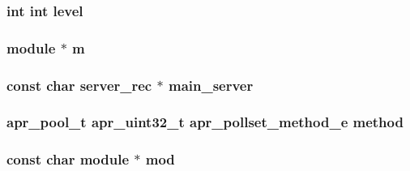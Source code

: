 \subsubsection[{\texorpdfstring{level}{level}}]{ {\bf int} {\bf int} level}\hypertarget{group__APACHE__CORE__CONFIG_ga46c1c4bc138aad1e20504bbee34f35a7}{}\label{group__APACHE__CORE__CONFIG_ga46c1c4bc138aad1e20504bbee34f35a7}
\subsubsection[{\texorpdfstring{m}{m}}]{ {\bf module} $\ast$ m}\hypertarget{group__APACHE__CORE__CONFIG_ga1891337ee8668593918a50b9e04be486}{}\label{group__APACHE__CORE__CONFIG_ga1891337ee8668593918a50b9e04be486}
\subsubsection[{\texorpdfstring{main\+\_\+server}{main_server}}]{\setlength{\rightskip}{0pt plus 5cm}const char {\bf server\+\_\+rec} $\ast$ main\+\_\+server}\hypertarget{group__APACHE__CORE__CONFIG_ga2e75076017a456eca3d9cb2098e66fbb}{}\label{group__APACHE__CORE__CONFIG_ga2e75076017a456eca3d9cb2098e66fbb}
\subsubsection[{\texorpdfstring{method}{method}}]{ {\bf apr\+\_\+pool\+\_\+t} {\bf apr\+\_\+uint32\+\_\+t} {\bf apr\+\_\+pollset\+\_\+method\+\_\+e} method}\hypertarget{group__APACHE__CORE__CONFIG_ga6c1b16298acdfc2ca3cba871da0daa17}{}\label{group__APACHE__CORE__CONFIG_ga6c1b16298acdfc2ca3cba871da0daa17}
\subsubsection[{\texorpdfstring{mod}{mod}}]{ const char {\bf module} $\ast$ mod}\hypertarget{group__APACHE__CORE__CONFIG_ga6c76cdc81cd99ff0a028e1bda018be59}{}\label{group__APACHE__CORE__CONFIG_ga6c76cdc81cd99ff0a028e1bda018be59}
